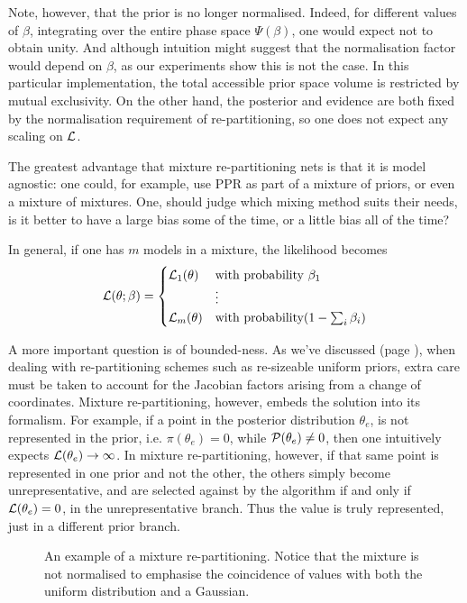\documentclass[usenatbib]{mnras}
\begin{document}
Note, however, that the prior is no longer normalised. Indeed, for
different values of \(\beta\), integrating over the entire phase
space \(\Psi(\beta)\), one would expect not to obtain unity. And
although intuition might suggest that the normalisation factor
would depend on \(\beta\), as our experiments show this is not the
case. In this particular implementation, the total accessible
prior space volume is restricted by mutual exclusivity. On the
other hand, the posterior and evidence are both fixed by the
normalisation requirement of re-partitioning, so one does not
expect any scaling on \({\cal L}\). 

The greatest advantage that mixture re-partitioning nets is
that it is model agnostic: one could, for example, use PPR as
part of a mixture of priors, or even a mixture of
mixtures. One, should judge which mixing method suits their
needs, is it better to have a large bias some of the time, or
a little bias all of the time?

In general,  if one has \(m\) models in a mixture, the likelihood becomes 
\begin{equation}
  {\cal L}(\theta; \beta)  = \begin{cases}
	{\cal L}_{1}(\theta) &  \text{with probability } \beta_{1}\\
		    &\vdots\\
	{\cal L}_{m}(\theta) & \text{with probability} (1- \sum_{i}\beta_{i})
	\end{cases}
\end{equation}


A more important question is of bounded-ness. As we've discussed
(page \pageref{domain-discussion}), when dealing with re-partitioning
schemes such as re-sizeable uniform priors, extra care must be
taken to account for the Jacobian factors arising from a change of
coordinates. Mixture re-partitioning, however, embeds the solution
into its formalism. For example, if a point in the posterior
distribution \(\theta_{e}\), is not represented in the prior, i.e.
\(\pi(\theta_{e}) = 0\), while \({\cal P}(\theta_{e}) \ne 0\), then
one intuitively expects \({\cal L}(\theta_{e}) \rightarrow
	\infty\). In mixture re-partitioning, however, if that same point is
represented in one prior and not the other, the others simply
become unrepresentative, and are selected against by the algorithm
if and only if \({\cal L}(\theta_{e}) = 0\), in the unrepresentative
branch. Thus the value is truly represented, just in a different
prior branch.

\begin{figure}
 
\caption{\label{org35d9a32}
An example of a mixture re-partitioning. Notice that the mixture is not normalised to emphasise the coincidence of values with both the uniform distribution and a Gaussian.}
\end{figure}
\end{document}
